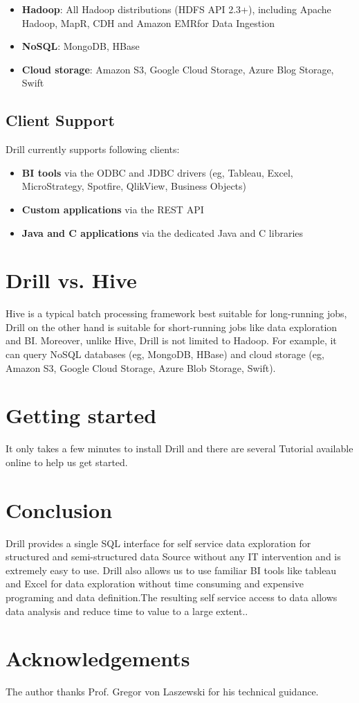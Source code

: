 \documentclass[9pt,twocolumn,twoside]{../../styles/osajnl}
\begin{document}
\begin{itemize}
	\item \textbf{Hadoop}: All Hadoop distributions (HDFS API 2.3+), including Apache Hadoop, MapR, CDH and Amazon EMRfor Data Ingestion
	\item \textbf{NoSQL}: MongoDB, HBase
	\item \textbf{Cloud storage}: Amazon S3, Google Cloud Storage, Azure Blog Storage, Swift

\end{itemize}

\subsection{Client Support}
Drill currently supports following clients:

\begin{itemize}
	\item \textbf{BI tools} via the ODBC and JDBC drivers (eg, Tableau, Excel, MicroStrategy, Spotfire, QlikView, Business Objects)
	\item \textbf{Custom applications} via the REST API
	\item \textbf{Java and C applications} via the dedicated Java and C libraries
	
\end{itemize}

\section{Drill vs. Hive}
Hive is a typical batch processing framework best suitable for long-running jobs, Drill 
on the other hand is suitable for short-running jobs like data exploration and BI.
Moreover, unlike Hive, Drill is not limited to Hadoop. For example, it can query NoSQL databases (eg, MongoDB, HBase) and cloud storage (eg, Amazon S3, Google Cloud Storage, Azure Blob Storage, Swift).

\section{Getting started}
It only takes a few minutes to install Drill and there are several Tutorial \cite{Tutorial} available online to help us get started.

\section{Conclusion}
Drill provides a single SQL interface for self service data exploration for structured and semi-structured data Source without any IT intervention and is extremely easy to use. Drill also allows us to use familiar BI tools like tableau and Excel for data exploration without time consuming and expensive programing and data definition.The resulting self service access to data allows data analysis and reduce time to value to a large extent..

\section*{Acknowledgements}

The author thanks Prof. Gregor von Laszewski for his technical guidance.



\end{document}
